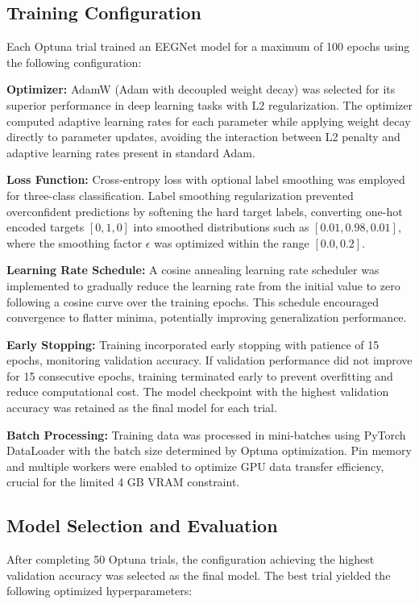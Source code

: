 \subsection{Training Configuration}

Each Optuna trial trained an EEGNet model for a maximum of 100 epochs using the following configuration:

\textbf{Optimizer:} AdamW (Adam with decoupled weight decay) was selected for its superior performance in deep learning tasks with L2 regularization. The optimizer computed adaptive learning rates for each parameter while applying weight decay directly to parameter updates, avoiding the interaction between L2 penalty and adaptive learning rates present in standard Adam.

\textbf{Loss Function:} Cross-entropy loss with optional label smoothing was employed for three-class classification. Label smoothing regularization prevented overconfident predictions by softening the hard target labels, converting one-hot encoded targets $[0, 1, 0]$ into smoothed distributions such as $[0.01, 0.98, 0.01]$, where the smoothing factor $\epsilon$ was optimized within the range $[0.0, 0.2]$.

\textbf{Learning Rate Schedule:} A cosine annealing learning rate scheduler was implemented to gradually reduce the learning rate from the initial value to zero following a cosine curve over the training epochs. This schedule encouraged convergence to flatter minima, potentially improving generalization performance.

\textbf{Early Stopping:} Training incorporated early stopping with patience of 15 epochs, monitoring validation accuracy. If validation performance did not improve for 15 consecutive epochs, training terminated early to prevent overfitting and reduce computational cost. The model checkpoint with the highest validation accuracy was retained as the final model for each trial.

\textbf{Batch Processing:} Training data was processed in mini-batches using PyTorch DataLoader with the batch size determined by Optuna optimization. Pin memory and multiple workers were enabled to optimize GPU data transfer efficiency, crucial for the limited 4 GB VRAM constraint.

\subsection{Model Selection and Evaluation}

After completing 50 Optuna trials, the configuration achieving the highest validation accuracy was selected as the final model. The best trial yielded the following optimized hyperparameters:

